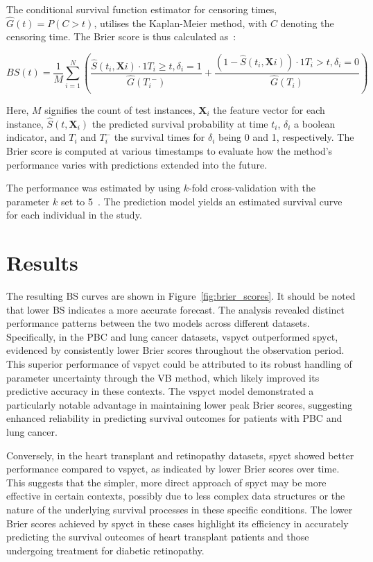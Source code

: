 \documentclass[3p,review,authoryear]{elsarticle}
\begin{document}
The conditional survival function estimator for censoring times, $\hat{G}(t)=P(C>t)$, utilises the Kaplan-Meier method, with $C$ denoting the censoring time.
The Brier score is thus calculated as~\citep{trickbrier}:

\begin{equation}
BS(t) = \frac{1}{M}\sum\limits_{i=1}^N \left(\frac{\hat{S}(t_i,\mathbf{X}i)\cdot1{T_i\geq{t},\delta_i=1}}{\hat{G}({T_i}^-)}+\frac{(1-\hat{S}(t_i,\mathbf{X}i))\cdot1{T_i>t, \delta_i=0}}{\hat{G}(T_i)}\right)
\label{eq:bs}
\end{equation}

Here, $M$ signifies the count of test instances, $\mathbf{X}_i$ the feature vector for each instance, $\hat{S}(t, \mathbf{X}_i)$ the predicted survival probability at time $t_i$, $\delta_i$ a boolean indicator, and $T_i$ and $T_i^-$ the survival times for $\delta_i$ being 0 and 1, respectively. The Brier score is computed at various timestamps to evaluate how the method's performance varies with predictions extended into the future.

The performance was estimated by using $k$-fold cross-validation with the parameter $k$ set to 5~\citep{elstatl}.
The prediction model yields an estimated survival curve for each individual in the study.

\section{Results}

The resulting BS curves are shown in Figure~\ref{fig:brier_scores}.
It should be noted that lower BS indicates a more accurate forecast.
The analysis revealed distinct performance patterns between the two models across different datasets.
Specifically, in the PBC and lung cancer datasets, \gls{vspyct} outperformed \gls{spyct}, evidenced by consistently lower Brier scores throughout the observation period.
This superior performance of \gls{vspyct} could be attributed to its robust handling of parameter uncertainty through the VB method, which likely improved its predictive accuracy in these contexts.
The \gls{vspyct} model demonstrated a particularly notable advantage in maintaining lower peak Brier scores, suggesting enhanced reliability in predicting survival outcomes for patients with PBC and lung cancer.

Conversely, in the heart transplant and retinopathy datasets, \gls{spyct} showed better performance compared to \gls{vspyct}, as indicated by lower Brier scores over time.
This suggests that the simpler, more direct approach of \gls{spyct} may be more effective in certain contexts, possibly due to less complex data structures or the nature of the underlying survival processes in these specific conditions.
The lower Brier scores achieved by \gls{spyct} in these cases highlight its efficiency in accurately predicting the survival outcomes of heart transplant patients and those undergoing treatment for diabetic retinopathy.
\end{document}
